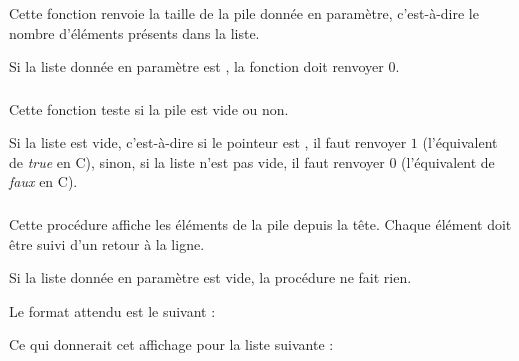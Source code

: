 \bigskip


\subsubsection*{}

\noindent Cette fonction renvoie la taille de la pile donnée en paramètre, c'est-à-dire le nombre d'éléments présents dans la liste.

\smallskip

\noindent Si la liste donnée en paramètre est , la fonction doit renvoyer $ 0 $.

\bigskip


\subsubsection*{}

\noindent Cette fonction teste si la pile est vide ou non.

\smallskip

\noindent Si la liste est vide, c'est-à-dire si le pointeur est , il faut renvoyer $ 1 $ (l'équivalent de \textit{true} en C), sinon, si la liste n'est pas vide, il faut renvoyer $ 0 $ (l'équivalent de \textit{faux} en C).

\bigskip


\subsubsection*{}

\noindent Cette procédure affiche les éléments de la pile depuis la tête.
Chaque élément doit être suivi d'un retour à la ligne.

\smallskip

\noindent Si la liste donnée en paramètre est vide, la procédure ne fait rien.

\noindent Le format attendu est le suivant :

\bigskip

\noindent {}

\bigskip

\noindent Ce qui donnerait cet affichage pour la liste suivante :

\clearpage

